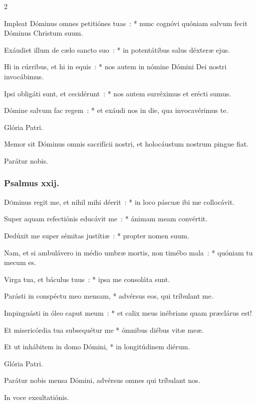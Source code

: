 \documentclass[9pt,twoside]{extarticle}
\begin{document}
\begin{multicols}{2}
{{Impleat Dóminus omnes petitiónes tuas~: * nunc cognóvi quóniam salvum fecit Dóminus Christum suum.

Exáudiet illum de cælo sancto suo~: * in potentátibus salus déxteræ ejus.

Hi in cúrribus, et hi in equis~: * nos autem in nómine Dómini Dei nostri invocábimus.

Ipsi obligáti sunt, et cecidérunt~: * nos autem surréximus et erécti sumus.

Dómine salvum fac regem~: * et exáudi nos in die, qua invocavérimus te.

Glória Patri.

\begin{tightlist}{}
\item {} Memor sit Dóminus omnis sacrifícii nostri, et holocáustum nostrum pingue fiat.
\item {} Parátur nobis.
\end{tightlist}

\subsubsection*{\center Psalmus xxij.}
\lettrine{D}óminus regit me, et nihil mihi déerit~: * in loco páscuæ ibi me collocávit.

Super aquam refectiónis educávit me~: * ánimam meam convértit.

Dedúxit me super sémitas justítiæ~: * propter nomen suum.

Nam, et si ambulávero in médio umbræ mortis, non timébo mala~: * quóniam tu mecum es.

Virga tua, et báculus tuus~: * ipsa me consoláta sunt.

Parásti in conspéctu meo mensam, * advérsus eos, qui tríbulant me.

Impinguásti in óleo caput meum~: * et calix meus inébrians quam præclárus est!

Et misericórdia tua subsequétur me * ómnibus diébus vitæ meæ.

Et ut inhábitem in domo Dómini, * in longitúdinem diérum.

Glória Patri.

\begin{tightlist}{}
\item {} Parátur nobis mensa Dómini, advérsus omnes qui tríbulant nos.
\item {} In voce exsultatiónis.
\end{tightlist}

}}
\end{multicols}
\end{document}
